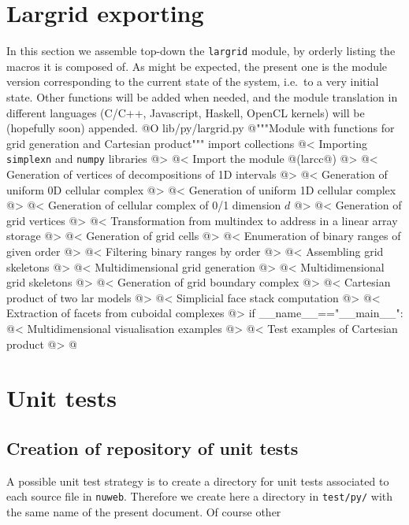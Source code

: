 \documentclass[11pt,oneside]{article}	%
\begin{document}
\section{Largrid exporting}
\label{sec:largrid}
In this section we assemble top-down the \texttt{largrid} module, by orderly listing the macros it is composed of. As might be expected, the present one is the module version corresponding to the current state of the system, i.e.~to a very initial state. Other functions will be added when needed, and the module translation in different languages (C/C++, Javascript, Haskell, OpenCL kernels) will be (hopefully soon) appended.
@O lib/py/largrid.py
@{"""Module with functions for grid generation and Cartesian product"""
import collections
@< Importing \texttt{simplexn} and \texttt{numpy} libraries @>
@< Import the module @(larcc@) @>
@< Generation of vertices of decompositions of 1D intervals  @>
@< Generation of uniform 0D cellular complex  @>
@< Generation of uniform 1D cellular complex  @>
@< Generation of cellular complex of 0/1 dimension $d$ @>
@< Generation of grid vertices  @>
@< Transformation from multindex to address in a linear array storage @>
@< Generation of grid cells  @>
@< Enumeration of binary ranges of given order @>
@< Filtering binary ranges by order @>
@< Assembling grid skeletons @>
@< Multidimensional grid generation @>
@< Multidimensional grid skeletons @>
@< Generation of grid boundary complex @>
@< Cartesian product of two lar models   @>
@< Simplicial face stack computation @>
@< Extraction of facets from cuboidal complexes @>
if __name__=="__main__":
	@< Multidimensional visualisation examples @>
	@< Test examples of Cartesian product @>
@}


\section{Unit tests}
\label{sec:tests}

\subsection{Creation of repository of unit tests}

A possible unit test strategy is to create a directory for unit tests associated to each source file in \texttt{nuweb}. Therefore we create here a directory in \texttt{test/py/} with the same name of the present document. Of course other 
\end{document}
